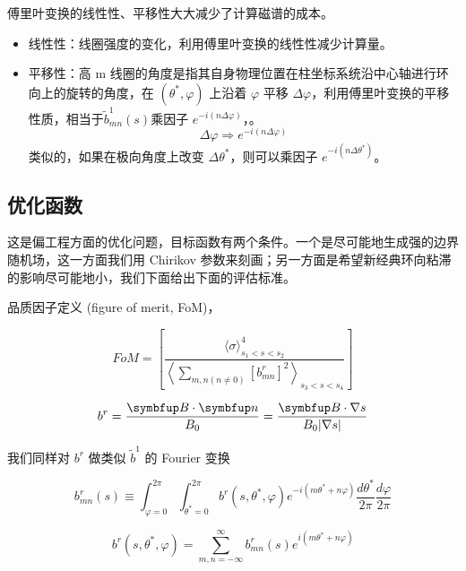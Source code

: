 傅里叶变换的线性性、平移性大大减少了计算磁谱的成本。

  \begin{itemize}
    \item 线性性：线圈强度的变化，利用傅里叶变换的线性性减少计算量。
    \item 平移性：高 m 线圈的角度是指其自身物理位置在柱坐标系统沿中心轴进行环向上的旋转的角度，在 $(\theta^*, \varphi)$ 上沿着 $\varphi$ 平移 $\Delta\varphi$，利用傅里叶变换的平移性质，相当于$\tilde{b}_{m n}^{1}(s)$乘因子 $e^{-i\left(n \Delta\varphi \right )}$，。
    $$\Delta\varphi \Rightarrow e^{-i\left(n \Delta\varphi \right )}$$ 类似的，如果在极向角度上改变 $\Delta\theta^*$，则可以乘因子 $e^{-i\left(n \Delta\theta^* \right )}$。
  \end{itemize}  
  


\subsection{优化函数}

    
    这是偏工程方面的优化问题，目标函数有两个条件。一个是尽可能地生成强的边界随机场，这一方面我们用 Chirikov 参数来刻画；另一方面是希望新经典环向粘滞的影响尽可能地小，我们下面给出下面的评估标准。
    
  品质因子定义 (figure of merit, FoM)，
  
  \begin{equation}
    FoM=\left[\frac{\langle\sigma\rangle_{s_{1}<s<s_{2}}^{4}}{\left\langle\sum_{m, n(n \neq 0)}\left[b_{m n}^{r}\right]^{2}\right\rangle_{s_{3}<s<s_{4}}}\right]
  \end{equation}
  
\begin{equation}
  b^r = \frac{\vect{B}\cdot\vect{n}}{B_0} = \frac{\vect{B}\cdot \nabla s}{B_0 |\nabla s|}
\end{equation}

我们同样对 $b^r$ 做类似 $\tilde{b}^1$ 的 Fourier 变换

\begin{equation}
  b_{m n}^{r}(s) \equiv \int_{\varphi=0}^{2 \pi} \int_{\theta^{*}=0}^{2 \pi} b^{r}\left(s, \theta^{*}, \varphi\right) e^{-i\left(m \theta^{*}+n \varphi\right)} \frac{d \theta^{*}}{2 \pi} \frac{d \varphi}{2 \pi}
\end{equation}

\begin{equation}
  b^{r}\left(s, \theta^{*}, \varphi\right)=\sum_{m, n=-\infty}^{\infty} b_{m n}^{r}(s) e^{i\left(m \theta^{*}+n \varphi\right)}
\end{equation}

